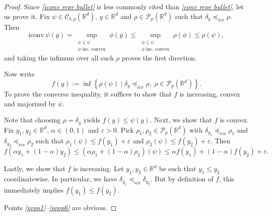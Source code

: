 \documentclass[reqno, a4paper]{amsart}
\newcommand{\lc}{\preceq_{\textnormal{c}}}
\newcommand{\lic}{\preceq_{icx}}
\newcommand{\iconv}{\mathrm{iconv}\,}
\newcommand{\PP}{\mathcal{P}}
\newcommand{\cP}{\mathcal{P}}
\renewcommand{\P}{\cP}
\newcommand{\R}{\mathbb R}
\theoremstyle{definition}
\theoremstyle{definition}
\theoremstyle{definition}
\newtheorem{remark}[theorem]{Remark}
\newcommand{\mean}{\mathrm{mean}}
\begin{document}
\begin{proof}
Since \textit{\ref{iconv repr bullet}} is less commonly cited than \textit{\ref{conv repr bullet}}, let us prove it. 
Fix $\psi\in{\mathcal{C}}_{b,p}(\R^d)$, $y\in \R^d$ and $\rho\in\P_p(\R^d)$ such that $\delta_y \lic \rho$. Then
$$\iconv\psi(y)=\sup_{ \substack{\phi\le\psi \\ \phi \text{ inc. convex}}} \phi(y)\leq \sup_{ \substack{\phi\le\psi \\ \phi \text{ inc. convex}}} \rho(\phi) \leq \rho(\psi),$$
and taking the infimum over all such $\rho$ proves the first direction. 

Now write $$f(y):=\inf\left\{\rho(\psi) \mid \delta_y\lic\rho,\; \rho\in\PP_p(\R^d)\right\}.$$
To prove the converse inequality, it suffices to show that $f$ is increasing, convex and majorized by $\psi$.

Note that choosing $\rho=\delta_y$ yields $f(y)\leq\psi(y)$. Next, we show that $f$ is convex. Fix $y_1,y_2\in\R^d$, $\alpha\in(0,1)$ and $\varepsilon>0$. Pick $\rho_1,\rho_2 \in\P_p(\R^d)$ with  $\delta_{y_1}\lic \rho_1$ and  $\delta_{y_2}\lic \rho_2$ such that $\rho_1(\psi)\leq f(y_1)+\varepsilon$ and $\rho_2(\psi)\leq f(y_2)+\varepsilon$. Then
$$f(\alpha y_1+(1-\alpha)y_2)\leq (\alpha\rho_1+(1-\alpha)\rho_2)(\psi) \leq \alpha f(y_1)+(1-\alpha)f(y_2)+ \varepsilon.$$

Lastly, we show that $f$ is increasing. Let $y_1,y_2\in\R^d$ be such that $y_1\leq y_2$ coordinatewise. In particular, we have $\delta_{y_1}\lic\delta_{y_2}$. But by definition of $f$, this immediately implies $f(y_1)\leq f(y_2).$ 

Points \textit{\ref{prop1}--\ref{prop6}} are obvious.
\end{proof}




\end{document}
